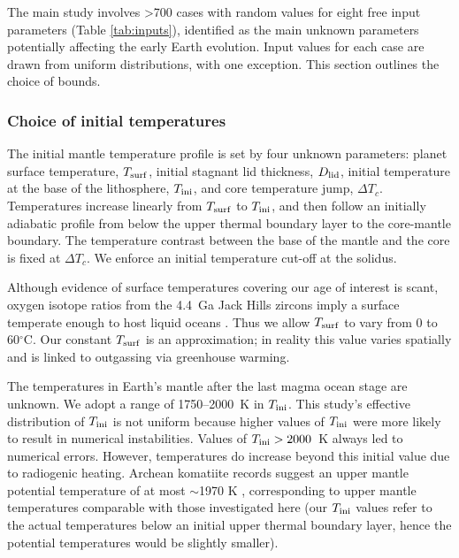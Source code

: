 The main study involves \textgreater 700 cases with random values for eight free input parameters (Table \ref{tab:inputs}), identified as the main unknown parameters potentially affecting the early Earth evolution. Input values for each case are drawn from uniform distributions, with one exception. This section outlines the choice of bounds.

\subsubsection{Choice of initial temperatures}

The initial mantle temperature profile is set by four unknown parameters: planet surface temperature, $T_{\rm surf}$, initial stagnant lid thickness, $D_{\rm lid}$, initial temperature at the base of the lithosphere, $T_{\rm ini}$, and core temperature jump, $\Delta T_c$. Temperatures increase linearly from $T_{\rm surf}$ to $T_{\rm ini}$, and then follow an initially adiabatic profile from below the upper thermal boundary layer to the core-mantle boundary. The temperature contrast between the base of the mantle and the core is fixed at $\Delta T_c$. We enforce an initial temperature cut-off at the solidus. 

Although evidence of surface temperatures covering our age of interest is scant, oxygen isotope ratios from the 4.4~Ga Jack Hills zircons imply a surface temperate enough to host liquid oceans \citep{Valley2002}. Thus we allow $T_{\rm surf}$ to vary from 0 to 60$^\circ$C. %
Our constant $T_{\rm surf}$ is an approximation; in reality this value varies spatially and is linked to outgassing via greenhouse warming. 

The temperatures in Earth's mantle after the last magma ocean stage are unknown. We adopt a range of 1750--2000~K in $T_{\rm ini}$. This study's effective distribution of $T_{\rm ini}$ is not uniform because higher values of $T_{\rm ini}$ were more likely to result in numerical instabilities. Values of $T_{\rm ini} > 2000$~K always led to numerical errors. However, temperatures do increase beyond this initial value due to radiogenic heating. Archean komatiite records suggest an upper mantle potential temperature of at most $\sim$1970 K \citep{HERZBERG2010}, corresponding to upper mantle temperatures comparable with those investigated here (our $T_{\rm ini}$ values refer to the actual temperatures below an initial upper thermal boundary layer, hence the potential temperatures would be slightly smaller). 

